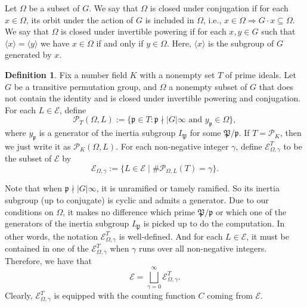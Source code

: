 \documentclass{amsart}
\numberwithin{equation}{section}
\theoremstyle{plain}
\theoremstyle{definition}
\newtheorem{definition}[theorem]{Definition}
\theoremstyle{remark}
\begin{document}
Let $\Omega$ be a subset of $G$.
We say that $\Omega$ is closed under conjugation if for each $x\in\Omega$, its orbit under the action of $G$ is included in $\Omega$,
i.e., $x\in\Omega\Rightarrow G\cdot x\subseteq\Omega$.
We say that $\Omega$ is closed under invertible powering if for each $x,y\in G$ such that $\langle x\rangle=\langle y\rangle$ we have $x\in\Omega$ if and only if $y\in\Omega$.
Here, $\langle x\rangle$ is the subgroup of $G$ generated by $x$.
\begin{definition}\label{def: specifications in general}
    Fix a number field $K$ with a nonempty set $T$ of prime ideals.
    Let $G$ be a transitive permutation group,
    and $\Omega$ a nonempty subset of $G$ that does not contain the identity and is closed under invertible powering and conjugation.
    For each $L\in\mathcal{E}$, define
    \begin{equation*}
        \mathcal{P}_{T}(\Omega,L):=\{\mathfrak{p}\in T: \mathfrak{p}\nmid\lvert G\rvert\infty\text{ and } y_{\mathfrak{p}}\in\Omega\},
    \end{equation*}
    where $y_{\mathfrak{p}}$ is a generator of the inertia subgroup $I_{\mathfrak{P}}$ for some $\mathfrak{P}/\mathfrak{p}$.
    If $T=\mathcal{P}_K$, then we just write it as $\mathcal{P}_{K}(\Omega,L)$.
    For each non-negative integer $\gamma$,
    define $\mathcal{E}_{\Omega,\gamma}^{T}$ to be the subset of $\mathcal{E}$ by
    \begin{equation*}
        \mathcal{E}_{\Omega,\gamma}:=\{L\in\mathcal{E}\mid\#\mathcal{P}_{\Omega,L}(T)=\gamma\}.
    \end{equation*}
\end{definition}
Note that when $\mathfrak{p}\nmid\lvert G\rvert\infty$, it is unramified or tamely ramified.
So its inertia subgroup (up to conjugate) is cyclic and admits a generator.
Due to our conditions on $\Omega$, it makes no difference which prime $\mathfrak{P}/\mathfrak{p}$ or which one of the generators of the inertia subgroup $I_{\mathfrak{P}}$ is picked up to do the computation.
In other words, the notation $\mathcal{E}_{\Omega,\gamma}^{T}$ is well-defined.
And for each $L\in\mathcal{E}$, it must be contained in one of the $\mathcal{E}_{\Omega,\gamma}^{T}$ when $\gamma$ runs over all non-negative integers.
Therefore, we have that
\begin{equation*}
	\mathcal{E}=\bigsqcup_{\gamma=0}^{\infty}\mathcal{E}_{\Omega,\gamma}^{T}.
\end{equation*}
Clearly, $\mathcal{E}_{\Omega,\gamma}^{T}$ is equipped with the counting function $C$ coming from $\mathcal{E}$.
\end{document}
